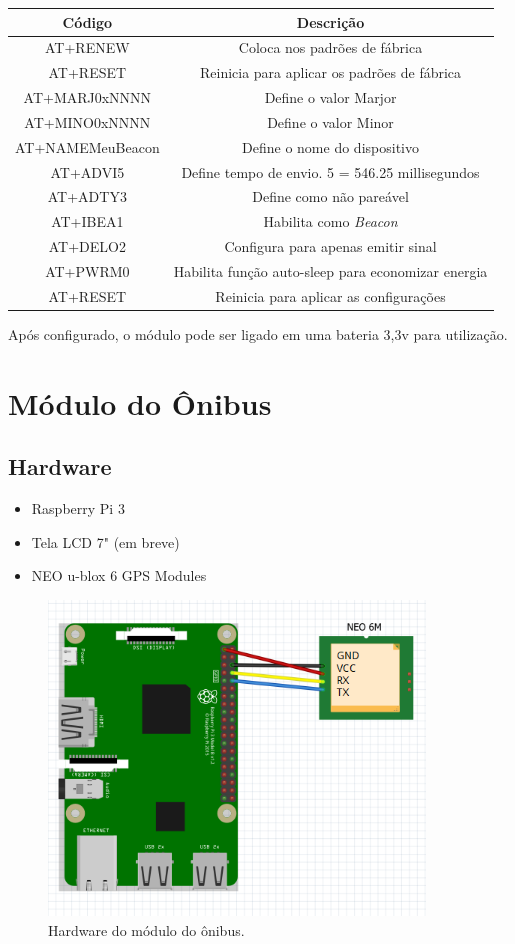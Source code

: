 \documentclass[
	12pt,				%
	oneside,			%
	a4paper,			%
	brazil				%
]{abntex2}
\begin{document}
\begin{tabular}{|c|c|}
\hline 
Código & Descrição \\ 
\hline 
AT+RENEW & Coloca nos padrões de fábrica \\ 
\hline 
AT+RESET & Reinicia para aplicar os padrões de fábrica \\ 
\hline 
AT+MARJ0xNNNN & Define o valor Marjor \\ 
\hline 
AT+MINO0xNNNN & Define o valor Minor \\ 
\hline 
AT+NAMEMeuBeacon & Define o nome do dispositivo \\ 
\hline 
AT+ADVI5 & Define tempo de envio. 5 = 546.25 millisegundos \\ 
\hline 
AT+ADTY3 & Define como não pareável \\ 
\hline 
AT+IBEA1 & Habilita como \textit{Beacon} \\ 
\hline 
AT+DELO2 & Configura para apenas emitir sinal \\ 
\hline 
AT+PWRM0 & Habilita função auto-sleep para economizar energia \\ 
\hline 
AT+RESET & Reinicia para aplicar as configurações \\ 
\hline 
\end{tabular} 

Após configurado, o módulo pode ser ligado em uma bateria 3,3v para utilização.

\newpage

\section{Módulo do Ônibus}

\subsection{Hardware}

\begin{itemize}
\item Raspberry Pi 3
\item Tela LCD 7" (em breve)
\item NEO u-blox 6 GPS Modules
\end{itemize}

\begin{figure}[H]
\centering
\includegraphics[width=10cm, center]{images/schematic-bus-module}
\caption{Hardware do módulo do ônibus.}
\label{Rotulo}
\end{figure}
\end{document}
